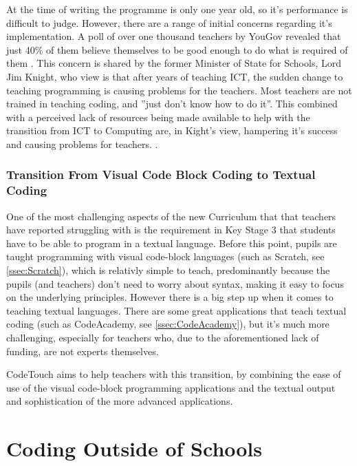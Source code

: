\documentclass[ %
                    author={Jonathan Rankin},
                supervisor={Dr. David May, Dr. Ian Holyer},
                    degree={MEng},
                     title={CodeTouch},
                  subtitle={A Revolutionary Way To Program Real Code On Touch Screen Devices},
                      type={enterprise},
                      year={2015 } ]{dissertation}
\begin{document}
At the time of writing the programme is only one year old, so it's performance is difficult to judge. However, there are a range of initial concerns regarding it's implementation. A poll of over one thousand teachers by YouGov revealed that just 40\% of them believe themselves to be good enough to do what is required of them \cite{IBtimesGrowingGap}. This concern is shared by the former Minister of State for Schools, Lord Jim Knight, who view is that after years of teaching ICT, the sudden change to teaching programming is causing problems for the teachers. Most teachers are not trained in teaching coding, and ''just don't know how to do it''. This combined with a perceived lack of resources being made available to help with the transition from ICT to Computing are, in Kight's view, hampering it's success and causing problems for teachers. \cite{IBTimesCurric}.


\subsubsection{Transition From Visual Code Block Coding to Textual Coding}
One of the most challenging aspects of the new Curriculum that that teachers have reported struggling with is the requirement in Key Stage 3 that students have to be able to program in a textual language. Before this point, pupils are taught programming with visual code-block languages (such as Scratch, see \ref{ssec:Scratch}), which is relativly simple to teach, predominantly because the pupils (and teachers) don't need to worry about syntax, making it easy to focus on the underlying principles. However there is a big step up when it comes to teaching textual languages. There are some great applications that teach textual coding (such as CodeAcademy, see \ref{ssec:CodeAcademy}), but it's much more challenging, especially for teachers who, due to the aforementioned lack of funding, are not experts themselves. 

CodeTouch aims to help teachers with this transition, by combining the ease of use of the visual code-block programming applications and the textual output and sophistication of the more advanced applications. 



\section {Coding Outside of Schools}
\end{document}
